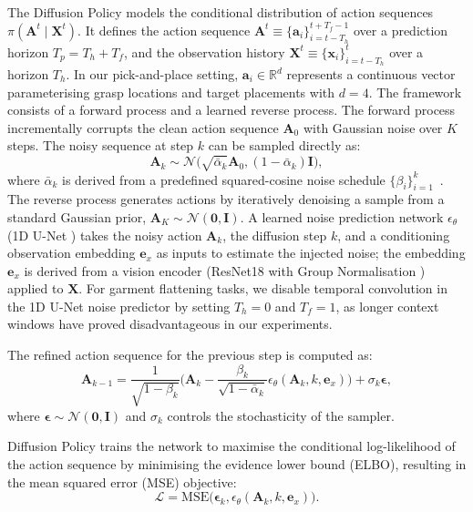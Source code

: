 \documentclass[journal]{IEEEtran}
\begin{document}
The Diffusion Policy models the conditional distribution of action sequences $\pi(\bm{A}^t \mid \bm{X}^t)$. It defines the action sequence $\bm{A}^t \equiv \{\bm{a}_i\}_{i=t-T_h}^{t+T_f-1}$ over a prediction horizon $T_p = T_h + T_f$, and the observation history $\bm{X}^t \equiv \{\bm{x}_i\}_{i=t-T_h}^{t}$ over a horizon $T_h$. In our pick-and-place setting, $\bm{a}_i \in \mathbb{R}^d$ represents a continuous vector parameterising grasp locations and target placements with $d=4$.
The framework consists of a forward process and a learned reverse process. The forward process incrementally corrupts the clean action sequence $\bm{A}_0$ with Gaussian noise over $K$ steps. The noisy sequence at step $k$ can be sampled directly as:
\begin{equation}
\bm{A}_k \sim \mathcal{N}\big(\sqrt{\bar{\alpha}_k}\bm{A}_0, (1 - \bar{\alpha}_k)\bm{I}\big),
\end{equation}
where $\bar{\alpha}_k$ is derived from a predefined squared-cosine noise schedule $\{\beta_i\}_{i=1}^k$~\cite{nichol2021improved}.
The reverse process generates actions by iteratively denoising a sample from a standard Gaussian prior, $\bm{A}_K \sim \mathcal{N}(\bm{0}, \bm{I})$. A learned noise prediction network $\epsilon_\theta$ (1D U-Net \cite{ronneberger2015u}) takes the noisy action $\bm{A}_k$, the diffusion step $k$, and a conditioning observation embedding $\bm{e}_x$ as inputs to estimate the injected noise; the embedding $\bm{e}_x$ is derived from a vision encoder (ResNet18 \cite{he2016deep} with Group Normalisation \cite{wu2018group}) applied to $\bm{X}$. For garment flattening tasks, we disable temporal convolution in the 1D U-Net noise predictor by setting $T_h = 0$ and $T_f = 1$, as longer context windows have proved disadvantageous in our experiments.

The refined action sequence for the previous step is computed as:
\begin{equation}
\bm{A}_{k-1} =
\frac{1}{\sqrt{1 - \beta_k}}
\Big(
\bm{A}_k -
\frac{\beta_k}{\sqrt{1 - \bar{\alpha}_k}}
\epsilon_\theta(\bm{A}_k, k, \bm{e}_x)
\Big)
+ \sigma_k \boldsymbol{\epsilon},
\end{equation}
where $\boldsymbol{\epsilon} \sim \mathcal{N}(\bm{0}, \bm{I})$ and $\sigma_k$ controls the stochasticity of the sampler.

Diffusion Policy trains the network to maximise the conditional log-likelihood of the action sequence by minimising the evidence lower bound (ELBO), resulting in the mean squared error (MSE) objective:
\begin{equation}
\mathcal{L} = \mathrm{MSE}\Big(\boldsymbol{\epsilon}_k, \epsilon_\theta(\bm{A}_k, k, \bm{e}_x)\Big).
\label{eqn:diffusion-policy-loss}
\end{equation}
\end{document}
